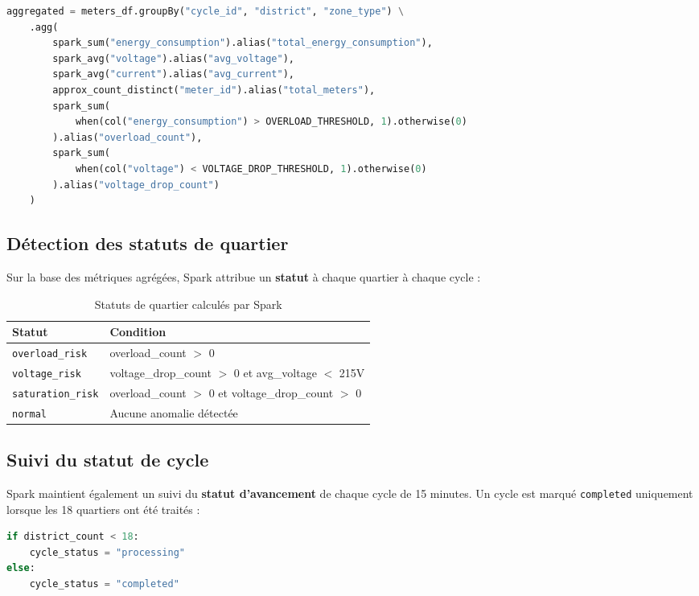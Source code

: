 \documentclass[12pt,a4paper]{report}
\begin{document}
\begin{lstlisting}[language=python, caption={Agrégation Spark par cycle et quartier}]
aggregated = meters_df.groupBy("cycle_id", "district", "zone_type") \
    .agg(
        spark_sum("energy_consumption").alias("total_energy_consumption"),
        spark_avg("voltage").alias("avg_voltage"),
        spark_avg("current").alias("avg_current"),
        approx_count_distinct("meter_id").alias("total_meters"),
        spark_sum(
            when(col("energy_consumption") > OVERLOAD_THRESHOLD, 1).otherwise(0)
        ).alias("overload_count"),
        spark_sum(
            when(col("voltage") < VOLTAGE_DROP_THRESHOLD, 1).otherwise(0)
        ).alias("voltage_drop_count")
    )
\end{lstlisting}

\subsection{Détection des statuts de quartier}

Sur la base des métriques agrégées, Spark attribue un \textbf{statut} à chaque quartier
à chaque cycle :

\begin{table}[H]
\centering
\begin{tabular}{|l|l|}
\hline
\textbf{Statut} & \textbf{Condition} \\
\hline
\texttt{overload\_risk} & overload\_count $>$ 0 \\
\hline
\texttt{voltage\_risk} & voltage\_drop\_count $>$ 0 et avg\_voltage $<$ 215V \\
\hline
\texttt{saturation\_risk} & overload\_count $>$ 0 et voltage\_drop\_count $>$ 0 \\
\hline
\texttt{normal} & Aucune anomalie détectée \\
\hline
\end{tabular}
\caption{Statuts de quartier calculés par Spark}
\label{tab:district_status}
\end{table}

\subsection{Suivi du statut de cycle}

Spark maintient également un suivi du \textbf{statut d'avancement} de chaque cycle
de 15 minutes. Un cycle est marqué \texttt{completed} uniquement lorsque les 18 quartiers
ont été traités :

\begin{lstlisting}[language=python, caption={Mise à jour du statut de cycle}]
if district_count < 18:
    cycle_status = "processing"
else:
    cycle_status = "completed"
\end{lstlisting}
\end{document}
